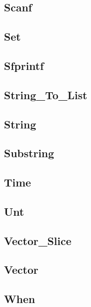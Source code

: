 \subsection{Scanf}                                      
\subsection{Set}					
\subsection{Sfprintf}                                   
\subsection{String\_To\_List}				
\subsection{String}                                     
\subsection{Substring}					
\subsection{Time}					
\subsection{Unt}					
\subsection{Vector\_Slice}				
\subsection{Vector}					
\subsection{When}					

